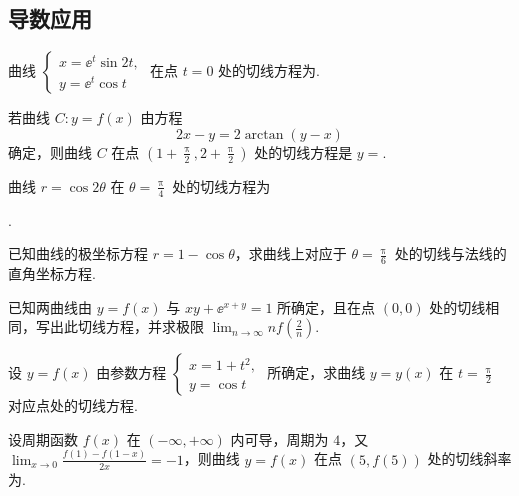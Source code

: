 \subsection{导数应用}

	\begin{ti}
		曲线 $\begin{cases}
			x = \ee^{t} \sin 2t,\\
			y = \ee^{t} \cos t
		\end{cases}$ 在点 $t = 0$ 处的切线方程为.
	\end{ti}

	\begin{ti}
		若曲线 $C: y = f(x)$ 由方程
		\[
			2x - y = 2\arctan(y - x)
		\]
		确定，则曲线 $C$ 在点 $\left( 1 + \frac{\uppi}{2}, 2 + \frac{\uppi}{2} \right)$ 处的切线方程是 $y = $\hone{6}.
	\end{ti}

	\begin{ti}
		曲线 $r = \cos 2 \theta$ 在 $\theta = \frac{\uppi}{4}$ 处的切线方程为
		
		\noindent{}.
	\end{ti}

	\begin{ti}
		已知曲线的极坐标方程 $r = 1 - \cos \theta$，求曲线上对应于 $\theta = \frac{\uppi}{6}$ 处的切线与法线的直角坐标方程.
	\end{ti}

	\begin{ti}
		已知两曲线由 $y = f(x)$ 与 $xy + \ee^{x + y} = 1$ 所确定，且在点 $(0,0)$ 处的切线相同，写出此切线方程，并求极限 $\lim_{n \to \infty} n f\left( \frac{2}{n} \right)$.
	\end{ti}

	\begin{ti}
		设 $y = f(x)$ 由参数方程 $\begin{cases}
			x = 1 + t^{2},\\
			y = \cos t
		\end{cases}$ 所确定，求曲线 $y = y(x)$ 在 $t = \frac{\uppi}{2}$ 对应点处的切线方程.
	\end{ti}

	\begin{ti}
        设周期函数 $f(x)$ 在 $(-\infty,+\infty)$ 内可导，周期为 $4$，又 $\lim_{x \to 0} \frac{f(1) - f(1 - x)}{2x} = -1$，则曲线 $y = f(x)$ 在点 $(5,f(5))$ 处的切线斜率为\kuo.
        
		\fourch{$\frac{1}{2}$}{$0$}{$-1$}{$-2$}
	\end{ti}

